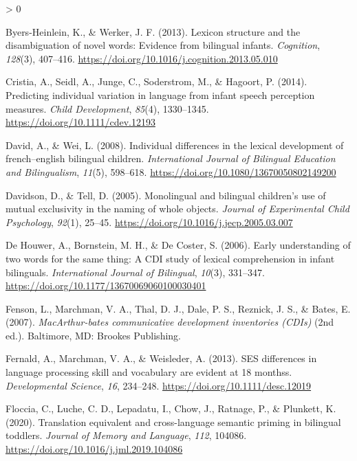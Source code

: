 \documentclass[
  english,
  ,man,floatsintext]{apa6}
\newlength{\cslhangindent}
\newenvironment{CSLReferences}[2] %
 {%
  \setlength{\parindent}{0pt}
  \ifodd #1 \everypar{\setlength{\hangindent}{\cslhangindent}}\ignorespaces\fi
  \ifnum #2 > 0
  \setlength{\parskip}{#2\baselineskip}
  \fi
 }%
 {}
\begin{document}
\begin{CSLReferences}{1}{0}
\leavevmode\hypertarget{ref-Byers-Heinlein_Werker_2013}{}%
Byers-Heinlein, K., \& Werker, J. F. (2013). Lexicon structure and the disambiguation of novel words: Evidence from bilingual infants. \emph{Cognition}, \emph{128}(3), 407--416. \url{https://doi.org/10.1016/j.cognition.2013.05.010}

\leavevmode\hypertarget{ref-Cristia_etal_2014}{}%
Cristia, A., Seidl, A., Junge, C., Soderstrom, M., \& Hagoort, P. (2014). Predicting individual variation in language from infant speech perception measures. \emph{Child Development}, \emph{85}(4), 1330--1345. \url{https://doi.org/10.1111/cdev.12193}

\leavevmode\hypertarget{ref-David_Wei_2008}{}%
David, A., \& Wei, L. (2008). Individual differences in the lexical development of french--english bilingual children. \emph{International Journal of Bilingual Education and Bilingualism}, \emph{11}(5), 598--618. \url{https://doi.org/10.1080/13670050802149200}

\leavevmode\hypertarget{ref-Davidson_Tell_2005}{}%
Davidson, D., \& Tell, D. (2005). Monolingual and bilingual children's use of mutual exclusivity in the naming of whole objects. \emph{Journal of Experimental Child Psychology}, \emph{92}(1), 25--45. \url{https://doi.org/10.1016/j.jecp.2005.03.007}

\leavevmode\hypertarget{ref-DeHouwer_etal_2006}{}%
De Houwer, A., Bornstein, M. H., \& De Coster, S. (2006). Early understanding of two words for the same thing: A CDI study of lexical comprehension in infant bilinguals. \emph{International Journal of Bilingual}, \emph{10}(3), 331--347. \url{https://doi.org/10.1177/13670069060100030401}

\leavevmode\hypertarget{ref-Fenson_etal_2007}{}%
Fenson, L., Marchman, V. A., Thal, D. J., Dale, P. S., Reznick, J. S., \& Bates, E. (2007). \emph{MacArthur-bates communicative development inventories (CDIs)} (2nd ed.). Baltimore, MD: Brookes Publishing.

\leavevmode\hypertarget{ref-Fernald_etal_2013}{}%
Fernald, A., Marchman, V. A., \& Weisleder, A. (2013). SES differences in language processing skill and vocabulary are evident at 18 monthss. \emph{Developmental Science}, \emph{16}, 234--248. \url{https://doi.org/10.1111/desc.12019}

\leavevmode\hypertarget{ref-Floccia_etal_2020}{}%
Floccia, C., Luche, C. D., Lepadatu, I., Chow, J., Ratnage, P., \& Plunkett, K. (2020). Translation equivalent and cross-language semantic priming in bilingual toddlers. \emph{Journal of Memory and Language}, \emph{112}, 104086. \url{https://doi.org/10.1016/j.jml.2019.104086}


\end{CSLReferences}
\end{document}
